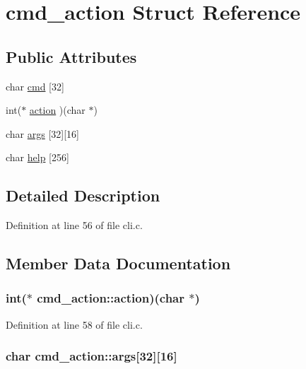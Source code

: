 \hypertarget{structcmd__action}{\section{cmd\-\_\-action Struct Reference}
\label{structcmd__action}
}
\subsection*{Public Attributes}
\begin{DoxyCompactItemize}
\item 
char \hyperlink{structcmd__action_a35a18d029cdcc1a21d74f5a6eadd95a9}{cmd} \mbox{[}32\mbox{]}
\item 
int($\ast$ \hyperlink{structcmd__action_ab84e60b55467e9abf0aa0c523a5c735d}{action} )(char $\ast$)
\item 
char \hyperlink{structcmd__action_a9b98733d18fba095c111b72a7962dcbe}{args} \mbox{[}32\mbox{]}\mbox{[}16\mbox{]}
\item 
char \hyperlink{structcmd__action_a426f4bdd272623577e9a5e8cafa85656}{help} \mbox{[}256\mbox{]}
\end{DoxyCompactItemize}


\subsection{Detailed Description}


Definition at line 56 of file cli.\-c.



\subsection{Member Data Documentation}
\hypertarget{structcmd__action_ab84e60b55467e9abf0aa0c523a5c735d}{
\subsubsection[{action}]{\setlength{\rightskip}{0pt plus 5cm}int($\ast$ cmd\-\_\-action\-::action)(char $\ast$)}}\label{structcmd__action_ab84e60b55467e9abf0aa0c523a5c735d}


Definition at line 58 of file cli.\-c.

\hypertarget{structcmd__action_a9b98733d18fba095c111b72a7962dcbe}{
\subsubsection[{args}]{\setlength{\rightskip}{0pt plus 5cm}char cmd\-\_\-action\-::args\mbox{[}32\mbox{]}\mbox{[}16\mbox{]}}}\label{structcmd__action_a9b98733d18fba095c111b72a7962dcbe}


